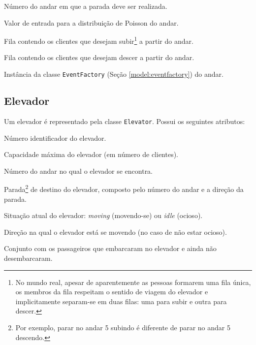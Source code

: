   \begin{description}[leftmargin=!,labelwidth=\widthof{\bfseries eventFactory}]
    \item[\texttt{number}] Número do andar em que a parada deve ser realizada.
    \item[\texttt{lambda}] Valor de entrada para a distribuição de Poisson do andar.
    \item[\texttt{upLine}] Fila contendo os clientes que desejam subir\footnote{No mundo real, apesar de aparentemente as pessoas formarem
    uma fila única, os membros da fila respeitam o sentido de viagem do elevador
    e implicitamente separam-se em duas filas: uma para subir e outra para
    descer.} a partir do andar.
    \item[\texttt{downLine}] Fila contendo os clientes que desejam descer a partir do andar.
    \item[\texttt{eventFactory}] Instância da classe \texttt{EventFactory} (Seção \ref{model:eventfactory}) do andar.
  \end{description}

\subsection{Elevador}

  Um elevador é representado pela classe \texttt{Elevator}. Possui os seguintes
  atributos:

  \begin{description}[leftmargin=!,labelwidth=\widthof{\bfseries arrivalFloor}]
    \item[\texttt{number}] Número identificador do elevador.
    \item[\texttt{capacity}] Capacidade máxima do elevador (em número de clientes).
    \item[\texttt{location}] Número do andar no qual o elevador se encontra.
    \item[\texttt{destination}] Parada\footnote{Por exemplo, parar no andar 5 subindo é diferente de parar no andar 5 descendo.} de destino do elevador, composto pelo número do andar e a direção da parada.
    \item[\texttt{status}] Situação atual do elevador: \textit{moving} (movendo-se) ou \textit{idle} (ocioso).
    \item[\texttt{direction}] Direção na qual o elevador está se movendo (no caso de não estar ocioso).
    \item[\texttt{passengers}] Conjunto com os passageiros que embarcaram no elevador e ainda não desembarcaram.
  \end{description}

